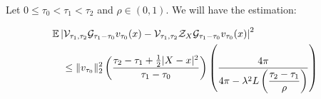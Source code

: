 \begin{proposition}

Let $0\leq \tau_0<\tau_1<\tau_2$ and $\rho\in(0,1)$. We will have the estimation:

\begin{equation*}
{
\begin{aligned}
&\mathbb E\left|
\mathcal V_{\tau_1,\tau_2}
\mathcal{G}_{\tau_1-\tau_0}v_{\tau_0}(x)
-
\mathcal V_{\tau_1,\tau_2}
\mathcal Z_X \mathcal{G}_{\tau_1-\tau_0}v_{\tau_0}(x)
\right|^2
\\
&\quad\leq
\|v_{\tau_0}\|_2^2\left(
\frac{
\tau_2-\tau_1+\frac12|X-x|^2
}{
\tau_1-\tau_0
}\right)
\left(\dfrac{4\pi}{4\pi - \lambda^2 L\left(\dfrac{\tau_2-\tau_1}{\rho}\right)}\right)
\end{aligned}
}
\end{equation*}
\end{proposition}
